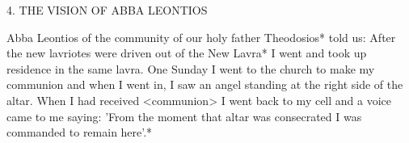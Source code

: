 4. THE VISION OF ABBA LEONTIOS

Abba Leontios of the community of our holy father Theodosios*
told us: After the new lavriotes were driven out of the New Lavra*
I went and took up residence in the same lavra. One Sunday I went
to the church to make my communion and when I went in, I saw
an angel standing at the right side of the altar. When I had received
<communion> I went back to my cell and a voice came to me
saying: 'From the moment that altar was consecrated I was
commanded to remain here'.*

